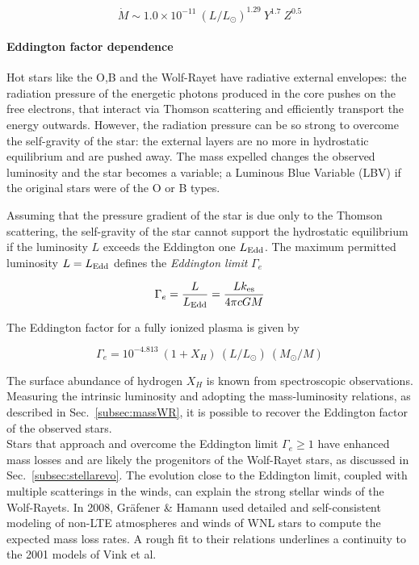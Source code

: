 \documentclass[a4paper,titlepage]{book}     	%
\newcommand{\mdot}{\ensuremath{\dot{M}}}
\begin{document}
\begin{equation}\label{eq:NugisLamers2000}
	\mdot \sim 1.0 \times 10^{-11}~(L/L_\odot)^{1.29}~Y^{1.7}~Z^{0.5}
\end{equation}

\paragraph{Eddington factor dependence}
Hot stars like the O,B and the Wolf-Rayet have radiative external envelopes: the radiation pressure of the energetic photons produced in the core pushes on the free electrons, that interact via Thomson scattering and efficiently transport the energy outwards. However, the radiation pressure can be so strong to overcome the self-gravity of the star: the external layers are no more in hydrostatic equilibrium and are pushed away. The mass expelled changes the observed luminosity and the star becomes a variable; a Luminous Blue Variable (LBV) if the original stars were of the O or B types.

Assuming that the pressure gradient of the star is due only to the Thomson scattering, the self-gravity of the star cannot support the hydrostatic equilibrium if the luminosity $L$ exceeds the Eddington one $L_{\rm Edd}$. The maximum permitted luminosity $L=L_{\rm Edd}$ defines the \emph{Eddington limit} $\Gamma_e$

\begin{equation}\label{eq:Eddingtonfactor}
\Gamma_e = \frac{L}{L_\textup{Edd}} = \frac{L k_\textup{es}}{4 \pi c G M}
\end{equation}

The Eddington factor for a fully ionized plasma is given by

\begin{equation}\label{eq:EddingtonObserved}
\Gamma_e = 10^{-4.813}~(1+X_H)~(L/L_\odot)~(M_\odot/M)
\end{equation}

The surface abundance of hydrogen $X_H$ is known from spectroscopic observations. Measuring the intrinsic luminosity and adopting the mass-luminosity relations, as described in Sec.\ \ref{subsec:massWR}, it is possible to recover the Eddington factor of the observed stars.\\


Stars that approach and overcome the Eddington limit $\Gamma_e \geq 1$ have enhanced mass losses and are likely the progenitors of the Wolf-Rayet stars, as discussed in Sec.\ \ref{subsec:stellarevo}. The evolution close to the Eddington limit, coupled with multiple scatterings in the winds, can explain the strong stellar winds of the Wolf-Rayets. In 2008, Gr{\"a}fener \& Hamann \cite{G&H_WRmassloss} used detailed and self-consistent modeling of non-LTE atmospheres and winds of WNL stars to compute the expected mass loss rates. A rough fit \cite{parsec2015_chen} to their relations underlines a continuity to the 2001 models of Vink et al.\
\end{document}
